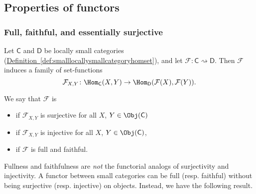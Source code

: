 \documentclass[main.tex]{subfiles}
\begin{document}
\subsection{Properties of functors}

\subsubsection{Full, faithful, and essentially surjective}

\begin{definition}
  \label{def:fullfaithfulfunctor}
  Let $\mathsf{C}$ and $\mathsf{D}$ be locally small categories (\hyperref[def:smalllocallysmallcategoryhomset]{Definition~\ref*{def:smalllocallysmallcategoryhomset}}), and let $\mathcal{F}: \mathsf{C} \rightsquigarrow \mathsf{D}$. Then $\mathcal{F}$ induces a family of set-functions
  \begin{equation*}
    \mathcal{F}_{X, Y}\colon \Hom_{\mathsf{C}}(X, Y) \to \Hom_{\mathsf{D}}(\mathcal{F}(X), \mathcal{F}(Y)).
  \end{equation*}

  We say that $\mathcal{F}$ is
  \begin{itemize}
    \item {} if $\mathcal{F}_{X, Y}$ is surjective for all $X$, $Y \in \Obj(\mathsf{C})$
    \item {} if $\mathcal{F}_{X, Y}$ is injective for all $X$, $Y \in \Obj(\mathsf{C})$,
    \item {} if $\mathcal{F}$ is full and faithful.
  \end{itemize}
\end{definition}

\begin{note}
  Fullness and faithfulness are \emph{not} the functorial analogs of surjectivity and injectivity. A functor between small categories can be full (resp. faithful) without being surjective (resp. injective) on objects. Instead, we have the following result.
\end{note}
\end{document}
